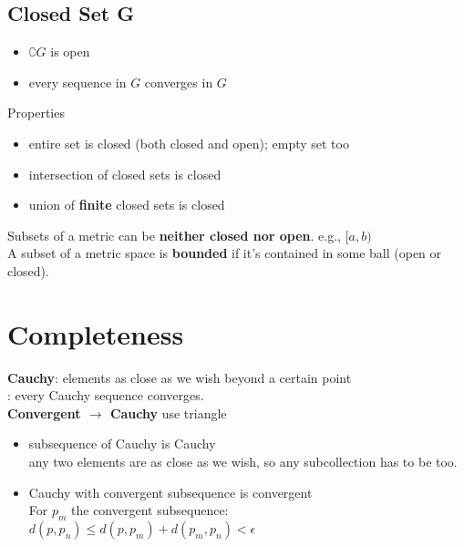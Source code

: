 \documentclass[12pt]{article}
\begin{document}
\begin{itemize}
\subsection*{Closed Set G}
\begin{framed}
\begin{itemize}
    \item $\complement G$ is open
    \item every sequence in $G$ converges in $G$
\end{itemize}
\end{framed}

Properties 
\begin{itemize}
    \item entire set is closed (both closed and open); empty set too
    \item intersection of closed sets is closed
    \item union of \textbf{finite} closed sets is closed\\
\end{itemize}
\bigskip
Subsets of a metric can be \textbf{neither closed nor open}. 
e.g., $[a, b)$\\

A subset of a metric space is \textbf{bounded} if it's contained in some ball (open or closed).

\section*{Completeness}

{\bf Cauchy}: elements as close as we wish beyond a certain point \\ 

: every Cauchy sequence converges. \\

\textbf{Convergent $\rightarrow$ Cauchy}
\textcolor[gray]{0.5}{use triangle}

\begin{itemize}
    \item subsequence of Cauchy is Cauchy\\
        \textcolor[gray]{0.5}{any two elements are as close as we wish, so any subcollection has to be too.}
    \item Cauchy with convergent subsequence is convergent \\ 
        \textcolor[gray]{0.5}{For $p_m$ the convergent subsequence:\\
        $d(p, p_n) \leq d(p, p_m) + d(p_m, p_n) < \epsilon$\\}
\end{itemize}
\bigskip


\end{itemize}
\end{document}
